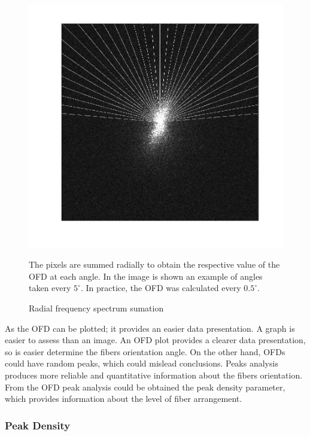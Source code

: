 \documentclass[12pt,a4paper]{article}
\begin{document}
\begin{figure}
  \includegraphics[width=\linewidth]{FiguresDisertation/figure3.jpg}
  \caption{Radial frequency spectrum sumation}
 \medskip
  \small
  The pixels are summed radially to obtain the respective value of the OFD at each angle. In the image is shown an example of angles taken every $5^{\circ}$. In practice, the OFD was calculated every $0.5^{\circ}$.
\end{figure}

As the OFD can be plotted; it provides an easier data presentation. A graph is easier to assess than an image.  An OFD plot provides a clearer data presentation, so is easier determine the fibers orientation angle. On the other hand, OFDs could have random peaks, which could mislead conclusions. Peaks analysis produces more reliable and quantitative information about the fibers orientation. From the  OFD peak analysis could be obtained the peak density parameter, which provides information about the level of fiber arrangement.

\subsubsection{Peak Density}
\end{document}

